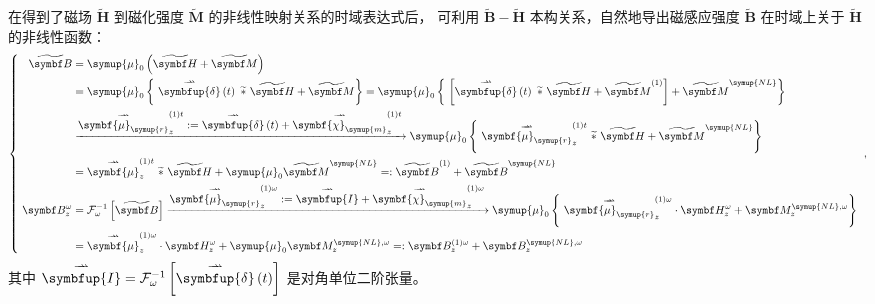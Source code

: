 在得到了磁场 $\widetilde{\symbf H}$ 到磁化强度 $\widetilde{\symbf M}$ 的非线性映射关系的时域表达式后，
可利用 $\widetilde{\symbf B}-\widetilde{\symbf H}$ 本构关系，自然地导出磁感应强度 $\widetilde{\symbf B}$ 在时域上关于 $\widetilde{\symbf H}$ 的非线性函数：
\begin{equation} \label{eq:2-4}
	\abovedisplayshortskip=0pt
	\abovedisplayskip=0pt
	\left\{\ \begin{aligned} \widetilde{\symbf B} &= {\symup{\mu}}_0 \left( \widetilde{\symbf H} + \widetilde{\symbf M} \right) \\ &= {\symup{\mu}}_0 \left\{\ \overset{\rightharpoonup\!\!\!\! \rightharpoonup}{\symbfup{\delta}} \left( t \right)\ \widetilde *\ \widetilde{\symbf H} + \widetilde{\symbf M} \right\} = {\symup{\mu}}_0 \left\{\ \left[ \overset{\rightharpoonup\!\!\!\! \rightharpoonup}{\symbfup{\delta}} \left( t \right)\ \widetilde *\ \widetilde{\symbf H} + \widetilde{\symbf M}^{(1)} \right] + \widetilde{\symbf M}^{{\symup{NL}}} \right\} \\& \xrightarrow[]{\displaystyle{ \overset{\rightharpoonup\!\!\!\! \rightharpoonup}{\symbf{\mu}_{\symup{r}}}^{(1)t}_{z} := \overset{\rightharpoonup\!\!\!\! \rightharpoonup}{\symbfup{\delta}} \left( t \right) + \overset{\rightharpoonup\!\!\!\! \rightharpoonup}{\symbf{\chi}_{\symup{m}}}^{(1)t}_{z}}} {\symup{\mu}}_0 \left\{\ \overset{\rightharpoonup\!\!\!\! \rightharpoonup}{\symbf{\mu}_{\symup{r}}}^{(1)t}_{z}\ \widetilde *\ \widetilde{\symbf H} + \widetilde{\symbf M}^{{\symup{NL}}} \right\} \\ &= \overset{\rightharpoonup\!\!\!\! \rightharpoonup}{\symbf{\mu}}^{(1)t}_{z}\ \widetilde *\ \widetilde{\symbf H} + {\symup{\mu}}_0 \widetilde{\symbf M}^{{\symup{NL}}} =: \widetilde{\symbf B}^{(1)} + \widetilde{\symbf B}^{{\symup{NL}}} \\ \symbf B^\omega_z &= \mathcal F^{-1}_\omega \left[ \widetilde{\symbf B} \right] \xrightarrow[]{\displaystyle{ \overset{\rightharpoonup\!\!\!\! \rightharpoonup}{\symbf{\mu}_{\symup{r}}}^{(1)\omega}_{z} := \overset{\rightharpoonup\!\!\!\! \rightharpoonup}{\symbfup{I}} + \overset{\rightharpoonup\!\!\!\! \rightharpoonup}{\symbf{\chi}_{\symup{m}}}^{(1)\omega}_{z}}} {\symup{\mu}}_0 \left\{\ \overset{\rightharpoonup\!\!\!\! \rightharpoonup}{\symbf{\mu}_{\symup{r}}}^{(1)\omega}_{z} \cdot \symbf H^{\omega}_z + \symbf M^{{\symup{NL}},\omega}_z \right\} \\ &= \overset{\rightharpoonup\!\!\!\! \rightharpoonup}{\symbf{\mu}}^{(1)\omega}_{z} \cdot \symbf H^{\omega}_z + {\symup{\mu}}_0 \symbf M^{{\symup{NL}},\omega}_z =: \symbf B^{(1)\omega}_z + \symbf B^{{\symup{NL}},\omega}_z \end{aligned}\right. ~,
\end{equation}
其中 $ \overset{\rightharpoonup\!\!\!\! \rightharpoonup}{\symbfup{I}} = \mathcal F^{-1}_\omega \left[ \overset{\rightharpoonup\!\!\!\! \rightharpoonup}{\symbfup{\delta}} \left( t \right) \right] $ 是对角单位二阶张量。

